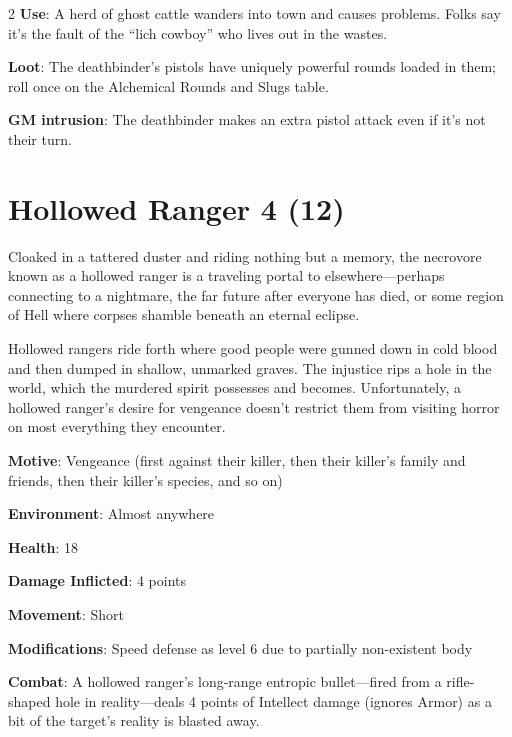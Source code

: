 \begin{multicols}{2}
\textbf{Use}: A herd of ghost cattle wanders into town and causes problems. Folks say it’s the fault of the “lich cowboy” who lives out in the wastes. 

\textbf{Loot}: The deathbinder’s pistols have uniquely powerful rounds loaded in them; roll once on the Alchemical Rounds and Slugs table.

\textbf{GM intrusion}: The deathbinder makes an extra pistol attack even if it’s not their turn.

\section{Hollowed Ranger 4 (12)}

Cloaked in a tattered duster and riding nothing but a memory, the necrovore known as a hollowed ranger is a traveling portal to elsewhere—perhaps connecting to a nightmare, the far future after everyone has died, or some region of Hell where corpses shamble beneath an eternal eclipse.

Hollowed rangers ride forth where good people were gunned down in cold blood and then dumped in shallow, unmarked graves. The injustice rips a hole in the world, which the murdered spirit possesses and becomes. Unfortunately, a hollowed ranger’s desire for vengeance doesn’t restrict them from visiting horror on most everything they encounter.

\textbf{Motive}: Vengeance (first against their killer, then their killer’s family and friends, then their killer’s species, and so on) 

\textbf{Environment}: Almost anywhere 

\textbf{Health}: 18 

\textbf{Damage Inflicted}: 4 points 

\textbf{Movement}: Short 

\textbf{Modifications}: Speed defense as level 6 due to partially non-existent body 

\textbf{Combat}: A hollowed ranger’s long-range entropic bullet—fired from a rifle-shaped hole in reality—deals 4 points of Intellect damage (ignores Armor) as a bit of the target’s reality is blasted away. 


\end{multicols}
